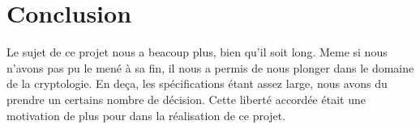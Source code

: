 \documentclass[a4paper, 11pt]{article}
\begin{document}
\section{Conclusion}

Le sujet de ce projet nous a beacoup plus, bien qu'il soit long.
Meme si nous n'avons pas pu le mené à sa fin, il nous a permis de nous
plonger dans le domaine de la cryptologie.
En deça, les spécifications étant assez large, nous avons du prendre
un certains nombre de décision.
Cette liberté accordée était une motivation de plus pour dans la
réalisation de ce projet.
\end{document}
